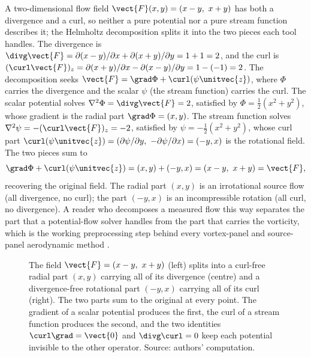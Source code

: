 \begin{example}
A two-dimensional flow field $\vect{F}(x, y) = (x - y,\ x + y)$ has
both a divergence and a curl, so neither a pure potential nor a pure
stream function describes it; the Helmholtz decomposition splits it
into the two pieces each tool handles. The divergence is
$\divg\vect{F} = \partial(x - y)/\partial x + \partial(x + y)/
\partial y = 1 + 1 = 2$, and the curl is $(\curl\vect{F})_{z} =
\partial(x + y)/\partial x - \partial(x - y)/\partial y = 1 - (-1) =
2$. The decomposition seeks $\vect{F} = \grad\Phi + \curl(\psi
\unitvec{z})$, where $\Phi$ carries the divergence and the scalar
$\psi$ (the stream function) carries the curl. The scalar potential
solves $\nabla^{2}\Phi = \divg\vect{F} = 2$, satisfied by
$\Phi = \tfrac{1}{2}(x^{2} + y^{2})$, whose gradient is the radial
part $\grad\Phi = (x, y)$. The stream function solves $\nabla^{2}\psi
= -(\curl\vect{F})_{z} = -2$, satisfied by $\psi = -\tfrac{1}{2}
(x^{2} + y^{2})$, whose curl part $\curl(\psi\unitvec{z}) =
(\partial\psi/\partial y,\ -\partial\psi/\partial x) = (-y, x)$ is the
rotational field. The two pieces sum to
\[
\grad\Phi + \curl(\psi\unitvec{z}) = (x, y) + (-y, x) = (x - y,\
x + y) = \vect{F},
\]
recovering the original field. The radial part $(x, y)$ is an
irrotational source flow (all divergence, no curl); the part
$(-y, x)$ is an incompressible rotation (all curl, no divergence). A
reader who decomposes a measured flow this way separates the part that
a potential-flow solver handles from the part that carries the
vorticity, which is the working preprocessing step behind every
vortex-panel and source-panel aerodynamic method
\cite{text:anderson-aerodynamics}.
\end{example}

\begin{figure}[h]
  \centering
  
  \caption[Helmholtz decomposition of a two-dimensional field.]{The
  field $\vect{F} = (x - y,\ x + y)$ (left) splits into a curl-free
  radial part $(x, y)$ carrying all of its divergence (centre) and a
  divergence-free rotational part $(-y, x)$ carrying all of its curl
  (right). The two parts sum to the original at every point. The
  gradient of a scalar potential produces the first, the curl of a
  stream function produces the second, and the two identities
  $\curl\grad = \vect{0}$ and $\divg\curl = 0$ keep each potential
  invisible to the other operator. Source: authors' computation.}
  \label{fig:vol02:ch08:helmholtz-split}
\end{figure}

